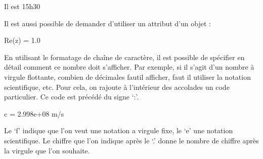 \documentclass[letterpaper,10pt,english]{sphinxhowto}
\begin{document}
\begin{sphinxVerbatim}[commandchars=\\\{\}]
\PYGZsq{}Il est 15h30\PYGZsq{}
\end{sphinxVerbatim}

\sphinxAtStartPar
Il est aussi possible de demander d’utiliser un attribut d’un objet :

\begin{sphinxVerbatim}[commandchars=\\\{\}]
    
\end{sphinxVerbatim}

\begin{sphinxVerbatim}[commandchars=\\\{\}]
Re(z) = 1.0
\end{sphinxVerbatim}

\sphinxAtStartPar
En utilisant le formatage de chaîne de caractère, il est possible de spécifier en détail comment ce nombre doit s’afficher. Par exemple, si il s’agit d’un nombre à virgule flottante, combien de décimales faut\sphinxhyphen{}il afficher, faut il utiliser la notation scientifique, etc. Pour cela, on rajoute à l’intérieur des accolades un code particulier. Ce code est précédé du signe ‘:’.

\begin{sphinxVerbatim}[commandchars=\\\{\}]
   
   
\end{sphinxVerbatim}

\begin{sphinxVerbatim}[commandchars=\\\{\}]
\PYGZsq{}c = 2.998e+08 m/s\PYGZsq{}
\end{sphinxVerbatim}

\sphinxAtStartPar
Le ‘f’ indique que l’on veut une notation a virgule fixe, le ‘e’ une notation scientifique. Le chiffre que l’on indique après le ‘.’ donne le nombre de chiffre après la virgule que l’on souhaite.
\end{document}
